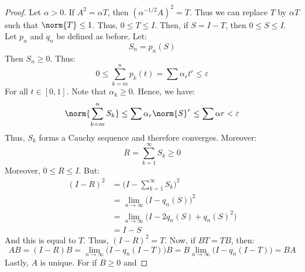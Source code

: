 \documentclass[crop=false,class=book,oneside]{standalone}                      %
\begin{document}
        \begin{proof}
            Let $\alpha>0$. If $A^{2}=\alpha{T}$, then
            $(\alpha^{\minus{1}/2}A)^{2}=T$. Thus we can replace
            $T$ by $\alpha{T}$ such that $\norm{T}\leq{1}$.
            Thus, $0\leq{T}\leq{I}$. Then, if $S=I-T$, then
            $0\leq{S}\leq{I}$. Let $p_{n}$ and $q_{n}$ be
            defined as before. Let:
            \begin{equation}
                S_{n}=p_{n}(S)
            \end{equation}
            Then $S_{n}\geq{0}$. Thus:
            \begin{equation}
                0\leq\sum_{k=m}^{n}p_{k}(t)=
                \sum\alpha_{r}t^{r}\leq\varepsilon
            \end{equation}
            For all $t\in[0,1]$. Note that $\alpha_{k}\geq{0}$.
            Hence, we have:
            \begin{equation}
                \norm{\sum_{k=m}^{n}S_{k}}
                \leq\sum\alpha_{r}\norm{S}^{r}\leq
                \sum\alpha{r}<\varepsilon
            \end{equation}
            Thus, $S_{k}$ forms a Cauchy sequence and therefore
            converges. Moreover:
            \begin{equation}
                R=\sum_{k=1}^{\infty}S_{k}\geq{0}
            \end{equation}
            Moreover, $0\leq{R}\leq{I}$. But:
            \begin{align}
                (I-R)^{2}
                &=\Big(I-\sum_{k=1}^{\infty}S_{k}\Big)^{2}\\
                &=\underset{n\rightarrow\infty}{\lim}
                    \big(I-q_{n}(S)\big)^{2}\\
                &=\underset{n\rightarrow\infty}{\lim}
                    \big(I-2q_{n}(S)+q_{n}(S)^{2}\big)\\
                &=I-S
            \end{align}
            And this is equal to $T$. Thus, $(I-R)^{2}=T$.
            Now, if $BT=TB$, then:
            \begin{equation}
                AB=(I-R)B
                =\underset{n\rightarrow\infty}{\lim}
                    \big(I-q_{n}(I-T)\big)B
                =B\underset{n\rightarrow\infty}{\lim}
                    \big(I-q_{n}(I-T)\big)
                =BA
            \end{equation}
            Lastly, $A$ is unique. For if $B\geq{0}$ and

\end{proof}
\end{document}
